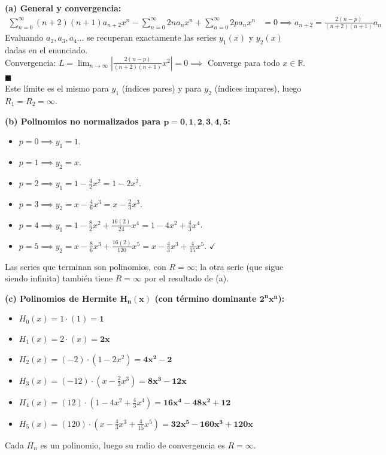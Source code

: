 \documentclass[11pt, a4paper]{article}
\begin{document}
\textbf{(a) General y convergencia:}
\begin{align*}
\sum_{n=0}^{\infty} (n+2)(n+1)a_{n+2} x^n - \sum_{n=0}^{\infty} 2n a_n x^n + \sum_{n=0}^{\infty} 2p a_n x^n &= 0 \implies a_{n+2} = \frac{2(n-p)}{(n+2)(n+1)} a_n
\end{align*}
Evaluando $a_2, a_3, a_4\dots$ se recuperan exactamente las series $y_1(x)$ y $y_2(x)$ dadas en el enunciado. \\
Convergencia: $L = \lim_{n\to\infty} \left| \frac{2(n-p)}{(n+2)(n+1)} x^2 \right| = 0 \implies$ Converge para todo $x \in \mathbb{R}$. \quad $\blacksquare$ \\
Este límite es el mismo para $y_1$ (índices pares) y para $y_2$ (índices impares), luego $R_1=R_2=\infty$.

\vspace{0.2cm}\noindent\textbf{(b) Polinomios no normalizados para $\bm{p=0,1,2,3,4,5}$:}
\begin{itemize}
\item $p=0 \implies y_1 = 1$.
\item $p=1 \implies y_2 = x$.
\item $p=2 \implies y_1 = 1 - \frac{4}{2}x^2 = 1 - 2x^2$.
\item $p=3 \implies y_2 = x - \frac{4}{6}x^3 = x - \frac{2}{3}x^3$.
\item $p=4 \implies y_1 = 1 - \frac{8}{2}x^2 + \frac{16(2)}{24}x^4 = 1 - 4x^2 + \frac{4}{3}x^4$.
\item $p=5 \implies y_2 = x - \frac{8}{6}x^3 + \frac{16(2)}{120}x^5 = x - \frac{4}{3}x^3 + \frac{4}{15}x^5$. \quad $\checkmark$
\end{itemize}
Las series que terminan son polinomios, con $R=\infty$; la otra serie (que sigue siendo infinita) también tiene $R=\infty$ por el resultado de (a).

\vspace{0.2cm}\noindent\textbf{(c) Polinomios de Hermite $\bm{H_n(x)}$ (con término dominante $\bm{2^n x^n}$):}
\begin{itemize}
\item $H_0(x) = 1 \cdot (1) = \mathbf{1}$
\item $H_1(x) = 2 \cdot (x) = \mathbf{2x}$
\item $H_2(x) = (-2) \cdot (1 - 2x^2) = \mathbf{4x^2 - 2}$
\item $H_3(x) = (-12) \cdot \left(x - \frac{2}{3}x^3\right) = \mathbf{8x^3 - 12x}$
\item $H_4(x) = (12) \cdot \left(1 - 4x^2 + \frac{4}{3}x^4\right) = \mathbf{16x^4 - 48x^2 + 12}$
\item $H_5(x) = (120) \cdot \left(x - \frac{4}{3}x^3 + \frac{4}{15}x^5\right) = \mathbf{32x^5 - 160x^3 + 120x}$
\end{itemize}
Cada $H_n$ es un polinomio, luego su radio de convergencia es $R=\infty$.
\end{document}
